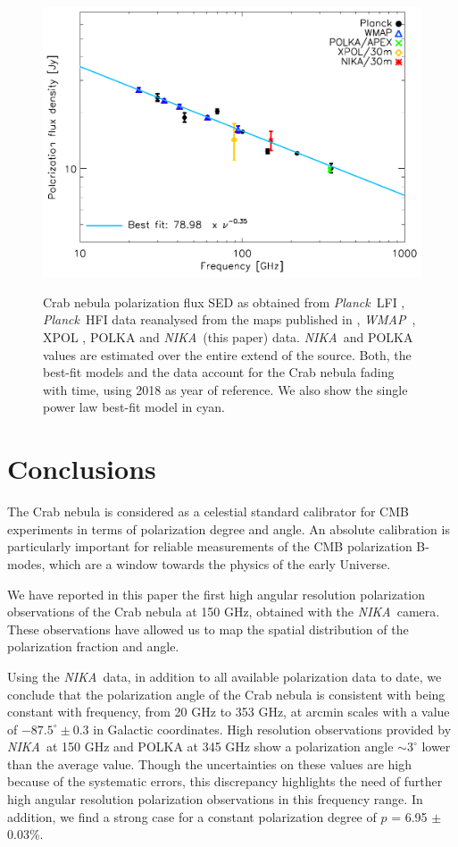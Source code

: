 \documentclass[twocolumn,traditabstract]{aa}
\def\NIKA{\textit{NIKA}}
\def\Planck{\textit{Planck}}
\def\WMAP{\textit{WMAP}}
\begin{document}
\begin{figure}
  \centering
             { \includegraphics[width=1\linewidth,keepaspectratio]{figures/Crab_SED_ipol.pdf}}
           \caption{Crab nebula polarization flux SED as obtained from \Planck\ LFI \citep{2015arXiv150702058P}, \Planck\ HFI data reanalysed from the maps published in \cite{refId0}, \WMAP\ \citep{2011ApJS..192...19W}, XPOL \citep{aumont2010}, POLKA \citep{2014PASP..126.1027W} and \NIKA\ (this paper) data. \NIKA\ and POLKA values are estimated over the entire extend of the source. Both, the best-fit models and the data account for the Crab nebula fading with time, using 2018 as year of reference. We also show the single power law best-fit model in cyan.}
\label{crab_SED_ipol}		
  \end{figure} 
 \noindent


\section{Conclusions}\label{sec:conclusions}
The Crab nebula is considered as a celestial standard calibrator for CMB experiments in
terms of polarization degree and angle. An absolute calibration is
particularly important for reliable measurements of the CMB polarization B-modes,
which are a window towards the physics of the early Universe.

We have reported in this paper the first high angular resolution polarization observations of the Crab nebula at 150 GHz, obtained with the \NIKA\ camera. These observations have
allowed us to map the spatial distribution of the polarization
fraction and angle.  

Using the \NIKA\ data, in addition to all available polarization data to date, we conclude that the
polarization angle of the Crab nebula is consistent with being constant with
frequency, from 20 GHz to 353 GHz, at arcmin scales with a value of
$-87.5^{\circ}\pm0.3$ in Galactic coordinates. High resolution observations provided by \NIKA\ at 150 GHz and POLKA at 345 GHz show
a polarization angle $\sim 3^{\circ}$ lower than the average value. Though the uncertainties on these values are high because of the systematic errors, this discrepancy highlights the need of further high angular resolution polarization observations in this frequency range.
In addition, we find a strong case for a constant polarization degree of $p$ = 6.95 $\pm$ 0.03\%. 
\end{document}
